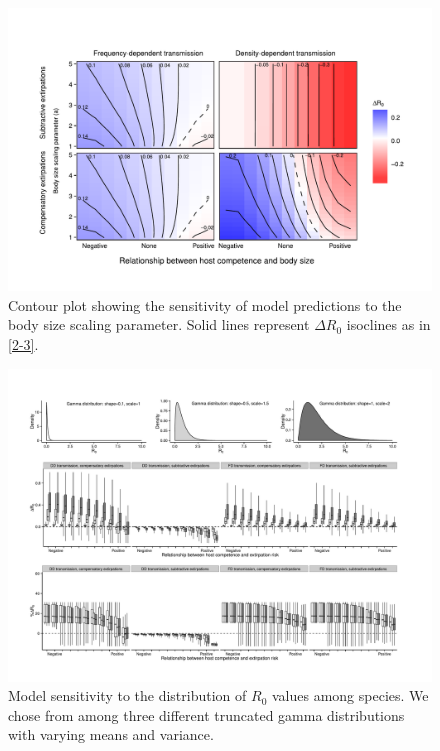 \begin{figure}
	\caption[Effect of body size scaling on disease outcomes]{
	Contour plot showing the sensitivity of model predictions to the body size scaling parameter. Solid lines represent $\Delta R_0$ isoclines as in \ref{2-3}.
	}
    \begin{center}
	\includegraphics[width=150mm]{figs/ch2/figS4.pdf}
    \end{center}
\label{2-s4}
\end{figure}

\begin{figure}
	\caption[Sensitivity to $R_0$ generative distributions]{
	Model sensitivity to the distribution of $R_0$ values among species. We chose from among three different truncated gamma distributions with varying means and variance.
	}
    \begin{center}
	\includegraphics[width=150mm]{figs/ch2/figS5.pdf}
    \end{center}
\label{2-s5}
\end{figure}

